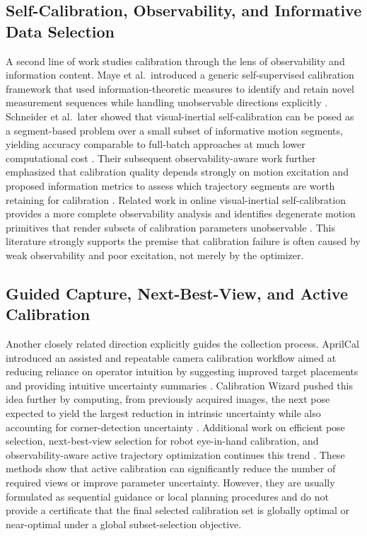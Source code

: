 \documentclass[11pt]{article}
\begin{document}
\subsection{Self-Calibration, Observability, and Informative Data Selection}
A second line of work studies calibration through the lens of observability
and information content.
Maye et al.\ introduced a generic self-supervised calibration framework that
used information-theoretic measures to identify and retain novel measurement
sequences while handling unobservable directions explicitly
\citep{maye2013self}.
Schneider et al.\ later showed that visual-inertial self-calibration can be
posed as a segment-based problem over a small subset of informative motion
segments, yielding accuracy comparable to full-batch approaches at much lower
computational cost \citep{schneider2017informative}.
Their subsequent observability-aware work further emphasized that calibration
quality depends strongly on motion excitation and proposed information metrics
to assess which trajectory segments are worth retaining for calibration
\citep{schneider2019observability}.
Related work in online visual-inertial self-calibration provides a more
complete observability analysis and identifies degenerate motion primitives
that render subsets of calibration parameters unobservable
\citep{yang2023online}.
This literature strongly supports the premise that calibration failure is
often caused by weak observability and poor excitation, not merely by the
optimizer.

\subsection{Guided Capture, Next-Best-View, and Active Calibration}
Another closely related direction explicitly guides the collection process.
AprilCal introduced an assisted and repeatable camera calibration workflow
aimed at reducing reliance on operator intuition by suggesting improved
target placements and providing intuitive uncertainty summaries
\citep{richardson2013aprilcal}.
Calibration Wizard pushed this idea further by computing, from previously
acquired images, the next pose expected to yield the largest reduction in
intrinsic uncertainty while also accounting for corner-detection uncertainty
\citep{peng2019calibration}.
Additional work on efficient pose selection, next-best-view selection for
robot eye-in-hand calibration, and observability-aware active trajectory
optimization continues this trend
\citep{rojtberg2018efficient,yang2023nbv,wang2025active}.
These methods show that active calibration can significantly reduce the number
of required views or improve parameter uncertainty.
However, they are usually formulated as sequential guidance or local planning
procedures and do not provide a certificate that the final selected
calibration set is globally optimal or near-optimal under a global
subset-selection objective.
\end{document}
